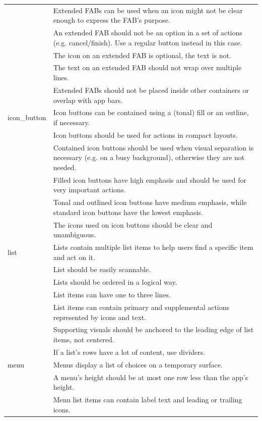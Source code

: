 \documentclass[11pt,titlepage,oneside,openany]{book}
\begin{document}
\begin{longtable}{|p{}|p{}|}
	~ & Extended FABs can be used when an icon might not be clear enough to express the FAB's purpose. \\ 
	~ & An extended FAB should not be an option in a set of actions (e.g. cancel/finish). Use a regular button instead in this case. \\ 
	~ & The icon on an extended FAB is optional, the text is not. \\ 
	~ & The text on an extended FAB should not wrap over multiple lines. \\ 
	~ & Extended FABs should not be placed inside other containers or overlap with app bars. \\ \hline
	icon\_button & Icon buttons can be contained using a (tonal) fill or an outline, if necessary. \\ 
	~ & Icon buttons should be used for actions in compact layouts. \\ 
	~ & Contained icon buttons should be used when visual separation is necessary (e.g. on a busy background), otherwise they are not needed. \\ 
	~ & Filled icon buttons have high emphasis and should be used for very important actions. \\ 
	~ & Tonal and outlined icon buttons have medium emphasis, while standard icon buttons have the lowest emphasis. \\ 
	~ & The icons used on icon buttons should be clear and unambiguous. \\ \hline
	list & Lists contain multiple list items to help users find a specific item and act on it. \\ 
	~ & List should be easily scannable. \\ 
	~ & Lists should be ordered in a logical way. \\ 
	~ & List items can have one to three lines. \\ 
	~ & List items can contain primary and supplemental actions represented by icons and text. \\ 
	~ & Supporting visuals should be anchored to the leading edge of list items, not centered. \\ 
	~ & If a list's rows have a lot of content, use dividers. \\ \hline
	menu & Menus display a list of choices on a temporary surface. \\ 
	~ & A menu's height should be at most one row less than the app's height. \\ 
	~ & Menu list items can contain label text and leading or trailing icons. \\ 

\end{longtable}
\end{document}
